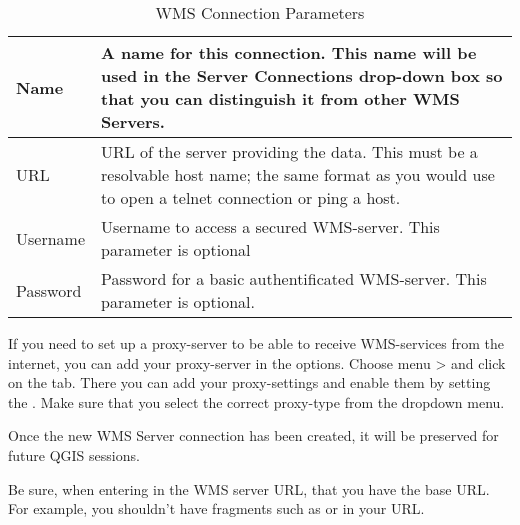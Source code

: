 \begin{table}[ht]
\centering
 \begin{tabular}{|l|p{11cm}|}
\hline Name & A name for this connection.  This name will be used in the
 Server Connections drop-down box so that you can distinguish it from
 other WMS Servers. \\
\hline URL \index{WMS!URL} & URL of the server providing the data.
 This must be a resolvable host name; the same format as you would use 
 to open a telnet connection or ping a host. \\
\hline Username \index{WMS!authentification} & Username to access a
secured WMS-server. This parameter is optional \\
\hline Password & Password for a basic authentificated WMS-server. This
parameter is optional.\\
\hline
\end{tabular}
\caption{WMS Connection Parameters}\label{tab:wms_connection_parms}
\end{table}

If you need to set up a proxy-server to be able to receive WMS-services
from the internet, you can add your proxy-server in the options.
Choose menu  > 
and click on the  tab. There you can add your proxy-settings 
and enable them by setting the .
Make sure that you select the correct proxy-type from the
 dropdown menu.

Once the new WMS Server connection has been created, it will be 
preserved for future QGIS sessions.

\begin{Tip}[ht]\caption{\textsc{On WMS Server URLs}}
Be sure, when entering in the WMS server URL, that you have
the base URL.  For example, you shouldn't have fragments such as
 or 
in your URL.
\end{Tip}

